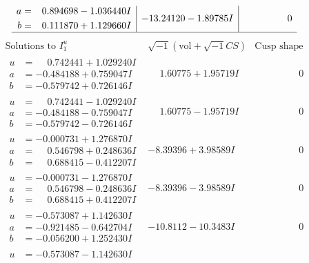 \documentclass[1p]{elsarticle_modified}
\theoremstyle{definition}
\newcommand{\I}{\sqrt{-1}}
\begin{document}
$$\begin{array}{c|c|c}
\begin{aligned}
a &= \phantom{-}0.894698 - 1.036440 I \\
b &= \phantom{-}0.111870 + 1.129660 I\end{aligned}
 & -13.24120 - 1.89785 I & \phantom{-0.000000 } 0\\
 \hline 
 \end{array}$$\newpage$$\begin{array}{c|c|c}  
\text{Solutions to }I^u_{1}& \I (\text{vol} + \sqrt{-1}CS) & \text{Cusp shape}\\
 \hline 
\begin{aligned}
u &= \phantom{-}0.742441 + 1.029240 I \\
a &= -0.484188 + 0.759047 I \\
b &= -0.579742 + 0.726146 I\end{aligned}
 & \phantom{-}1.60775 + 1.95719 I & \phantom{-0.000000 } 0 \\ \hline\begin{aligned}
u &= \phantom{-}0.742441 - 1.029240 I \\
a &= -0.484188 - 0.759047 I \\
b &= -0.579742 - 0.726146 I\end{aligned}
 & \phantom{-}1.60775 - 1.95719 I & \phantom{-0.000000 } 0 \\ \hline\begin{aligned}
u &= -0.000731 + 1.276870 I \\
a &= \phantom{-}0.546798 + 0.248636 I \\
b &= \phantom{-}0.688415 - 0.412207 I\end{aligned}
 & -8.39396 + 3.98589 I & \phantom{-0.000000 } 0 \\ \hline\begin{aligned}
u &= -0.000731 - 1.276870 I \\
a &= \phantom{-}0.546798 - 0.248636 I \\
b &= \phantom{-}0.688415 + 0.412207 I\end{aligned}
 & -8.39396 - 3.98589 I & \phantom{-0.000000 } 0 \\ \hline\begin{aligned}
u &= -0.573087 + 1.142630 I \\
a &= -0.921485 - 0.642704 I \\
b &= -0.056200 + 1.252430 I\end{aligned}
 & -10.8112 - 10.3483 I & \phantom{-0.000000 } 0 \\ \hline\begin{aligned}
u &= -0.573087 - 1.142630 I \\

\end{aligned}
\end{array}$$
\end{document}
